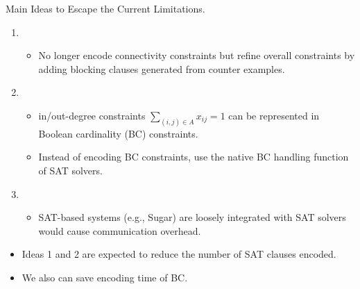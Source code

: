 \documentclass{beamer}
\begin{document}
\begin{frame}{Main Ideas to Escape the Current Limitations.}
\begin{enumerate}
\item {}
\begin{itemize}
\item No longer encode connectivity constraints but refine overall
  constraints by adding blocking clauses generated from counter examples.
\end{itemize}
\item {}
\begin{itemize}
\item in/out-degree constraints $\sum_{(i,j) \in A} x_{ij}=1$ can be
  represented in Boolean cardinality (BC) constraints.
\item Instead of encoding BC constraints, use the native BC handling function of SAT solvers.
\end{itemize}
\item {}
\begin{itemize}
\item SAT-based systems (e.g., Sugar) are loosely integrated
  with SAT solvers would cause communication overhead. 
\end{itemize}
\end{enumerate}
\begin{block}{}
\begin{itemize}
\item Ideas 1 and 2 are expected to reduce the number of SAT clauses encoded.
\item We also can save encoding time of BC.
\end{itemize}
\end{block}
\end{frame}
\end{document}
